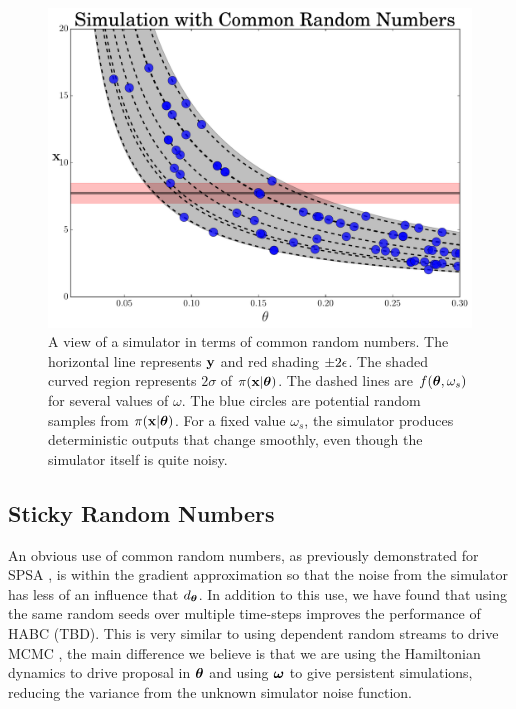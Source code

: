 \documentclass[]{article}
\begin{document}
\begin{figure}[t]
\vskip 0.2in
\begin{center}
\includegraphics[width=0.95\columnwidth]{./images/exp_crn_figure.pdf}
\caption{\small{A view of a simulator in terms of common random numbers.  The horizontal line represents ${\bf y}$ and red shading $\pm 2\epsilon$.  The shaded curved region represents $2\sigma$ of $\pi({\bf x}|{\bm \theta})$.  The dashed lines are $f({\bm \theta}, \omega_s)$ for several values of $\omega$.  The blue circles are potential random samples from $\pi({\bf x}|{\bm \theta})$.  For a fixed value $\omega_s$, the simulator produces deterministic outputs that change smoothly, even though the simulator itself is quite noisy.}}
\label{fig:exp-crns}
\end{center}
\vskip -0.2in
\end{figure} 

\subsection{Sticky Random Numbers}
An obvious use of common random numbers, as previously demonstrated for SPSA \cite{kleinman1999simulation}, is within the gradient approximation so that the noise from the simulator has less of an influence that $d_{{\bm \theta}}$.  In addition to this use, we have found that using the same random seeds over multiple time-steps improves the performance of HABC (TBD).  This is very similar to using dependent random streams to drive MCMC \cite{Murray2012,Neal2012}, the main difference we believe is that we are using the Hamiltonian dynamics to drive proposal in ${\bm \theta}$ and using ${\bm \omega}$ to give persistent simulations, reducing the variance from the unknown simulator noise function.
\end{document}
